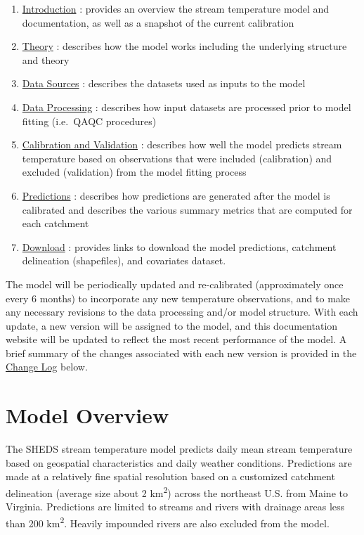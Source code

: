 \documentclass[
]{book}
\providecommand{\tightlist}{%
  \setlength{\itemsep}{0pt}\setlength{\parskip}{0pt}}
\begin{document}
\begin{enumerate}
\def\labelenumi{\arabic{enumi}.}
\tightlist
\item
  \hyperref[intro]{Introduction} : provides an overview the stream temperature model and documentation, as well as a snapshot of the current calibration
\item
  \hyperref[theory]{Theory} : describes how the model works including the underlying structure and theory
\item
  \hyperref[data-sources]{Data Sources} : describes the datasets used as inputs to the model
\item
  \hyperref[data-processing]{Data Processing} : describes how input datasets are processed prior to model fitting (i.e.~QAQC procedures)
\item
  \hyperref[calibration-and-validation]{Calibration and Validation} : describes how well the model predicts stream temperature based on observations that were included (calibration) and excluded (validation) from the model fitting process
\item
  \hyperref[predictions]{Predictions} : describes how predictions are generated after the model is calibrated and describes the various summary metrics that are computed for each catchment
\item
  \hyperref[download]{Download} : provides links to download the model predictions, catchment delineation (shapefiles), and covariates dataset.
\end{enumerate}

The model will be periodically updated and re-calibrated (approximately once every 6 months) to incorporate any new temperature observations, and to make any necessary revisions to the data processing and/or model structure. With each update, a new version will be assigned to the model, and this documentation website will be updated to reflect the most recent performance of the model. A brief summary of the changes associated with each new version is provided in the \hyperref[change-log]{Change Log} below.

\section{Model Overview}\label{model-overview}

The SHEDS stream temperature model predicts daily mean stream temperature based on geospatial characteristics and daily weather conditions. Predictions are made at a relatively fine spatial resolution based on a customized catchment delineation (average size about 2 km\textsuperscript{2}) across the northeast U.S. from Maine to Virginia. Predictions are limited to streams and rivers with drainage areas less than 200 km\textsuperscript{2}. Heavily impounded rivers are also excluded from the model.
\end{document}
